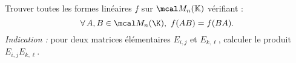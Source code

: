 Trouver toutes les formes linéaires $f$ sur $\mcal M_n(\mathbb K)$ vérifiant :
\begin{equation*}
    \forall\,A,B \in \mcal M_n(\K),~ f(AB) = f(BA).
\end{equation*}
\emph{Indication :} pour deux matrices élémentaires $E_{i,j}$ et $E_{k,\ell}$, calculer le produit $E_{i,j}E_{k,\ell}$. 
